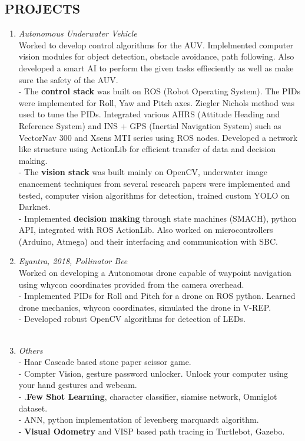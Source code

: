 \documentclass[margin]{res}
\begin{document}
\begin{resume}
\section{PROJECTS } \begin{enumerate}
  \item  {\large{\sl Autonomous Underwater Vehicle}}\\
 Worked to develop control algorithms for the AUV. Implelmented computer vision modules for object detection, obstacle avoidance, path following. Also developed a smart AI to perform the given tasks effieciently as well as make sure the safety of the AUV.\\
        - The   \textbf{control stack} was built on ROS (Robot Operating System). The PIDs were implemented for Roll, Yaw and Pitch axes. Ziegler Nichols method was used to tune the PIDs. Integrated various AHRS (Attitude Heading and Reference System) and INS + GPS (Inertial Navigation System) such as VectorNav 300 and Xsens MTI series using ROS nodes. Developed a network like structure using ActionLib for efficient transfer of data and decision making.\\
        - The   \textbf{vision stack} was built mainly on OpenCV, underwater image enancement techniques from several research papers were implemented and tested, computer vision algorithms for detection, trained custom YOLO on Darknet.\\
	- Implemented   \textbf{decision making} through state machines (SMACH), python API, integrated with ROS ActionLib. Also worked on microcontrollers (Arduino, Atmega) and their interfacing and communication with SBC.
 \item {\large{\sl Eyantra, 2018, Pollinator Bee}}\\
 Worked on developing a Autonomous drone capable of waypoint navigation using whycon coordinates provided from the camera overhead.\\
  	- Implemented PIDs for Roll and Pitch for a drone on ROS python. Learned drone mechanics, whycon coordinates, simulated the drone in V-REP. \\
	- Developed robust OpenCV algorithms for detection of LEDs. \\
\\
 \item {\large{\sl Others}}\\

  	- Haar Cascade based stone paper scissor game. \\
	- Compter Vision, gesture password unlocker. Unlock your computer using your hand gestures and webcam.\\
	- .\textbf{Few Shot Learning}, character  classifier, siamise network,  Omniglot dataset. \\
	- ANN, python implementation of levenberg marquardt algorithm.\\
	- \textbf{Visual Odometry} and VISP based path tracing in Turtlebot, Gazebo.\\
	\end{enumerate}



\end{resume}
\end{document}
